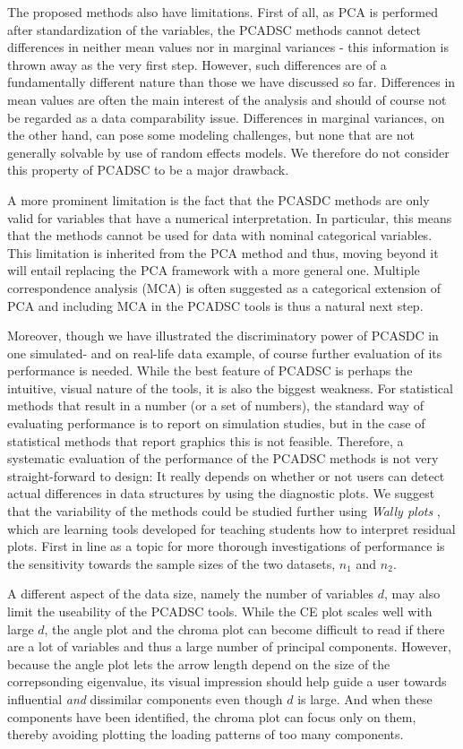 \documentclass[a4paper,12pt]{article}
\begin{document}
The proposed methods also have limitations. First of all, as PCA is performed after standardization of the variables, the PCADSC methods cannot detect differences in neither mean values nor in marginal variances - this information is thrown away as the very first step. However, such differences are of a fundamentally different nature than those we have discussed so far. Differences in mean values are often the main interest of the analysis and should of course not be regarded as a data comparability issue. Differences in marginal variances, on the other hand, can pose some modeling challenges, but none that are not generally solvable by use of random effects models. We therefore do not consider this property of PCADSC to be a major drawback.

A more prominent limitation is the fact that the PCASDC methods are only valid for variables that have a numerical interpretation. In particular, this means that the methods cannot be used for data with nominal categorical variables. This limitation is inherited from the PCA method and thus, moving beyond it will entail replacing the PCA framework with a more general one. Multiple correspondence analysis (MCA) is often suggested as a categorical extension of PCA \cite{Abdi2010} and including MCA in the PCADSC tools is thus a natural next step.

Moreover, though we have illustrated the discriminatory power of PCASDC in one simulated- and on real-life data example, of course further evaluation of its performance is needed.
While the best feature of PCADSC is perhaps the intuitive, visual nature of the tools, it is also the biggest weakness. For statistical methods that result in a number (or a set of numbers), the standard way of evaluating performance is to report on simulation studies, but in the case of statistical methods that report graphics this is not feasible. Therefore, a systematic evaluation of the performance of the PCADSC methods is not very straight-forward to design: It really depends on whether or not users can detect actual differences in data structures by using the diagnostic plots. We suggest that the variability of the methods could be studied further using \textit{Wally plots} \cite{Ekstrom2014}, which are learning tools developed for teaching students how to interpret residual plots. First in line as a topic for more thorough investigations of performance is the sensitivity towards the sample sizes of the two datasets, $n_1$ and $n_2$.

A different aspect of the data size, namely the number of variables $d$, may also limit the useability of the PCADSC tools. While the CE plot scales well with large $d$, the angle plot and the chroma plot can become difficult to read if there are a lot of variables and thus a large number of principal components. However, because the angle plot lets the arrow length depend on the size of the correpsonding eigenvalue, its visual impression should help guide a user towards influential \textit{and} dissimilar components even though $d$ is large. And when these components have been identified, the chroma plot can focus only on them, thereby avoiding plotting the loading patterns of too many components.  
\end{document}
